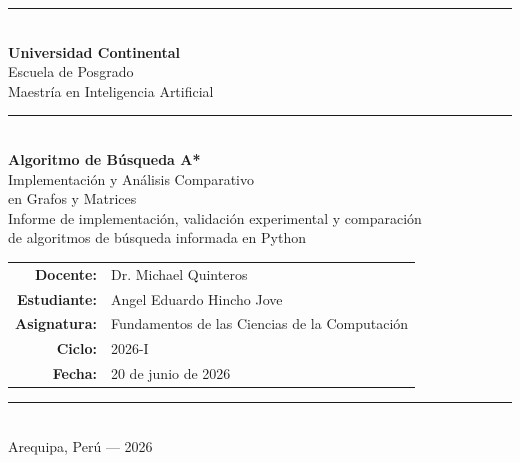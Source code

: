 




\begin{titlepage}
    \centering
    \vspace*{1.5cm}

    \rule{\linewidth}{0.5pt}\\[0.4cm]
    {\Large \textbf{Universidad Continental}}\\[0.2cm]
    {\large Escuela de Posgrado}\\[0.1cm]
    {\normalsize Maestr\'ia en Inteligencia Artificial}\\
    \rule{\linewidth}{0.5pt}\\[2cm]

    {\LARGE \textbf{Algoritmo de B\'usqueda A*}}\\[0.5cm]
    {\Large Implementaci\'on y An\'alisis Comparativo\\en Grafos y Matrices}\\[1cm]
    {\normalsize Informe de implementaci\'on, validaci\'on experimental y comparaci\'on\\
    de algoritmos de b\'usqueda informada en Python}\\[3cm]

    \begin{tabular}{rl}
        \textbf{Docente:}     & Dr. Michael Quinteros \\[0.3cm]
        \textbf{Estudiante:}  & Angel Eduardo Hincho Jove \\[0.3cm]
        \textbf{Asignatura:}  & Fundamentos de las Ciencias de la Computaci\'on \\[0.3cm]
        \textbf{Ciclo:}       & 2026-I \\[0.3cm]
        \textbf{Fecha:}       & 20 de junio de 2026 \\
    \end{tabular}

    \vfill

    \rule{\linewidth}{0.5pt}\\[0.2cm]
    {\small Arequipa, Per\'u --- 2026}
\end{titlepage}

\tableofcontents
\newpage

